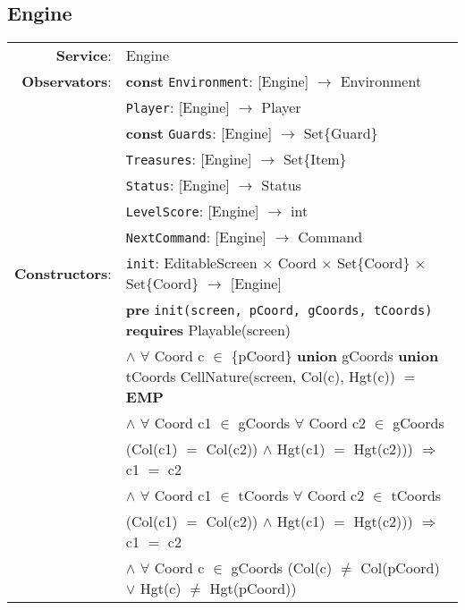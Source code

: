 \documentclass[8pt]{article}
\begin{document}
\subsection{Engine}

{\small
\begin{longtable}{rl}
  \textbf{Service}: & \textrm{Engine}  \\
  \textbf{Observators}: & \textbf{const} \texttt{Environment}: \textrm{[Engine]} $\rightarrow$ \textrm{Environment} \\
  & \texttt{Player}: \textrm{[Engine]} $\rightarrow$ \textrm{Player} \\
  & \textbf{const} \texttt{Guards}: \textrm{[Engine]} $\rightarrow$ \textrm{Set\{Guard\}} \\
  & \texttt{Treasures}: \textrm{[Engine]} $\rightarrow$ \textrm{Set\{Item\}} \\
  & \texttt{Status}: \textrm{[Engine]} $\rightarrow$ \textrm{Status} \\
  & \texttt{LevelScore}: \textrm{[Engine]} $\rightarrow$ \textrm{int} \\
  & \texttt{NextCommand}: \textrm{[Engine]} $\rightarrow$ \textrm{Command} \\
  \textbf{Constructors}: &\texttt{init}: \textrm{EditableScreen} $\times$ \textrm{Coord} $\times$ \textrm{Set\{Coord\}} $\times$ \textrm{Set\{Coord\}} $\rightarrow$ \textrm{[Engine]} \\
  & \quad \textbf{pre} \texttt{init(screen, pCoord, gCoords, tCoords)} \textbf{requires} \textrm{Playable(screen)}\\
  & \quad\quad\quad $\land$ $\forall$ \textrm{Coord} c $\in$ \{pCoord\} \textbf{union} gCoords \textbf{union} tCoords \textrm{CellNature(screen, Col(c), Hgt(c))} $=$ \textbf{EMP} \\
  & \quad\quad\quad $\land$ $\forall$ \textrm{Coord} c1 $\in$ gCoords $\forall$ \textrm{Coord} c2 $\in$ gCoords \\
  & \quad\quad\quad\quad\quad (\textrm{Col(c1)} $=$ \textrm{Col(c2))} $\land$ \textrm{Hgt(c1)} $=$ \textrm{Hgt(c2))}) $\Rightarrow$ c1 $=$ c2\\
  & \quad\quad\quad $\land$ $\forall$ \textrm{Coord} c1 $\in$ tCoords $\forall$ \textrm{Coord} c2 $\in$ tCoords \\
  & \quad\quad\quad\quad\quad (\textrm{Col(c1)} $=$ \textrm{Col(c2))} $\land$ \textrm{Hgt(c1)} $=$ \textrm{Hgt(c2))}) $\Rightarrow$ c1 $=$ c2\\
  & \quad\quad\quad $\land$ $\forall$ \textrm{Coord} c $\in$ gCoords (\textrm{Col(c)} $\neq$ \textrm{Col(pCoord)} $\lor$ \textrm{Hgt(c)} $\neq$ \textrm{Hgt(pCoord)})\\

\end{longtable}}
\end{document}
